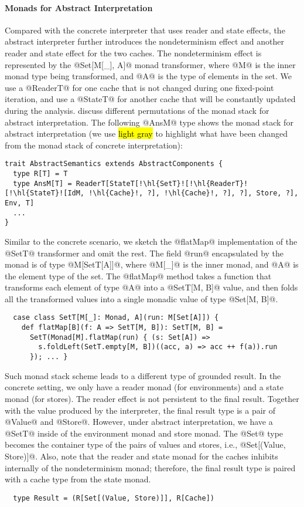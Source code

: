 \paragraph{Monads for Abstract Interpretation}
Compared with the concrete interpreter that uses reader and state effects, the
abstract interpreter further introduces the nondeterminism effect and another
reader and state effect for the two caches. The nondeterminism effect is
represented by the @Set[M[_], A]@ monad transformer, where @M@ is the inner
monad type being transformed, and @A@ is the type of elements in the set. We use a
@ReaderT@ for one cache that is not changed during one fixed-point
iteration, and use a @StateT@ for another cache that will be constantly updated
during the analysis.  \citet{DBLP:journals/pacmpl/DaraisLNH17} discuss
different permutations of the monad stack for abstract interpretation. The
following @AnsM@ type shows the monad stack for abstract interpretation (we use
\hl{light gray} to highlight what have been changed from the monad stack of
concrete interpretation):
\begin{lstlisting}[escapechar=!]
trait AbstractSemantics extends AbstractComponents {
  type R[T] = T
  type AnsM[T] = ReaderT[StateT[!\hl{SetT}![!\hl{ReaderT}![!\hl{StateT}![IdM, !\hl{Cache}!, ?], !\hl{Cache}!, ?], ?], Store, ?], Env, T]
  ...
}
\end{lstlisting}

Similar to the concrete scenario, we sketch the @flatMap@ implementation of the
@SetT@ transformer and omit the rest. The field @run@ encapsulated by the monad
is of type @M[SetT[A]]@, where @M[_]@ is the inner monad, and @A@ is the element
type of the set. The @flatMap@ method takes a function that transforms each
element of type @A@ into a @SetT[M, B]@ value, and then folds
all the transformed values into a single monadic value of type @Set[M, B]@.
\begin{lstlisting}
  case class SetT[M[_]: Monad, A](run: M[Set[A]]) {
    def flatMap[B](f: A => SetT[M, B]): SetT[M, B] =
      SetT(Monad[M].flatMap(run) { (s: Set[A]) =>
        s.foldLeft(SetT.empty[M, B])((acc, a) => acc ++ f(a)).run
      }); ... }
\end{lstlisting}

Such monad stack scheme leads to a different type of grounded result. In the concrete
setting, we only have a reader monad (for environments) and a state monad (for
stores). The reader effect is not persistent to the final result. Together
with the value produced by the interpreter, the final result type is a pair of
@Value@ and @Store@. However, under abstract interpretation, we have a @SetT@
inside of the environment monad and store monad. The @Set@ type becomes the
container type of the pairs of values and stores, i.e., @Set[(Value, Store)]@.
Also, note that the reader and state monad for the caches inhibits internally
of the nondeterminism monad; therefore, the final result type is paired
with a cache type from the state monad.
\begin{lstlisting}
  type Result = (R[Set[(Value, Store)]], R[Cache])
\end{lstlisting}


